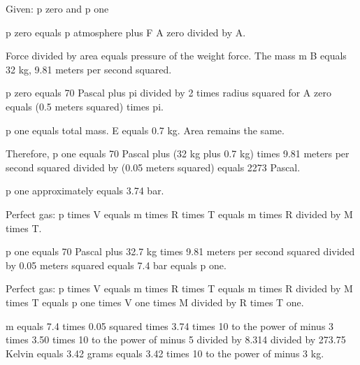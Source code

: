 Given: p zero and p one

p zero equals p atmosphere plus F A zero divided by A.

Force divided by area equals pressure of the weight force. The mass m B equals 32 kg, 9.81 meters per second squared.

p zero equals 70 Pascal plus pi divided by 2 times radius squared for A zero equals (0.5 meters squared) times pi.

p one equals total mass. E equals 0.7 kg. Area remains the same.

Therefore, p one equals 70 Pascal plus (32 kg plus 0.7 kg) times 9.81 meters per second squared divided by (0.05 meters squared) equals 2273 Pascal.

p one approximately equals 3.74 bar.

Perfect gas: p times V equals m times R times T equals m times R divided by M times T.

p one equals 70 Pascal plus 32.7 kg times 9.81 meters per second squared divided by 0.05 meters squared equals 7.4 bar equals p one.

Perfect gas: p times V equals m times R times T equals m times R divided by M times T equals p one times V one times M divided by R times T one.

m equals 7.4 times 0.05 squared times 3.74 times 10 to the power of minus 3 times 3.50 times 10 to the power of minus 5 divided by 8.314 divided by 273.75 Kelvin equals 3.42 grams equals 3.42 times 10 to the power of minus 3 kg.